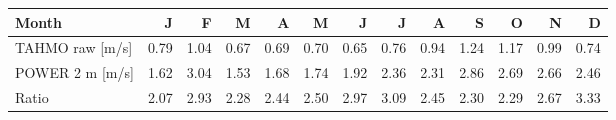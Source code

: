 \begin{tabular}{lrrrrrrrrrrrr}
\toprule
Month & J & F & M & A & M & J & J & A & S & O & N & D\\
\midrule
TAHMO raw [m/s] & 0.79 & 1.04 & 0.67 & 0.69 & 0.70 & 0.65 & 0.76 & 0.94 & 1.24 & 1.17 & 0.99 & 0.74\\
POWER 2 m [m/s] & 1.62 & 3.04 & 1.53 & 1.68 & 1.74 & 1.92 & 2.36 & 2.31 & 2.86 & 2.69 & 2.66 & 2.46\\
Ratio & 2.07 & 2.93 & 2.28 & 2.44 & 2.50 & 2.97 & 3.09 & 2.45 & 2.30 & 2.29 & 2.67 & 3.33\\
\bottomrule
\end{tabular}
